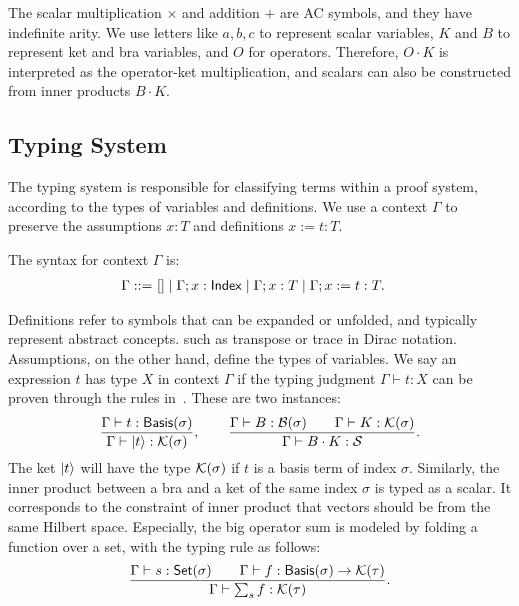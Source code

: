 The scalar multiplication $\times$ and addition $+$ are AC symbols,
and they have indefinite arity.  We use letters like $a, b, c$ to
represent scalar variables, $K$ and $B$ to represent ket and bra
variables, and $O$ for operators.  Therefore, $O \cdot K$ is
interpreted as the operator-ket multiplication, and scalars can also
be constructed from inner products $B \cdot K$.


\subsection{Typing System}
The typing system is responsible for classifying terms within a proof system, according to the types of variables and definitions. 
We use a context \( \Gamma \) to preserve the assumptions \( x : T \) and definitions \( x := t : T \).
\begin{definition}[Context]
    The syntax for context \( \Gamma \) is:
    \begin{align*}
        \Gamma ::= &\ [] \mid \Gamma; x : \mathsf{Index} \mid \Gamma; x : T \mid \Gamma; x := t : T.
    \end{align*}
\end{definition}
Definitions refer to symbols that can be expanded or unfolded, and typically represent abstract concepts. such as transpose or trace in Dirac notation. Assumptions, on the other hand, define the types of variables.
We say an expression \( t \) has type \( X \) in context \( \Gamma \) if the typing judgment \( \Gamma \vdash t : X \) can be proven through the rules in~. These are two instances:
\begin{gather*}
    \frac{\Gamma \vdash t : \mathsf{Basis}(\sigma)}{\Gamma \vdash \ket{t} : \mathcal{K}(\sigma)},
    \qquad
    \frac{\Gamma \vdash B : \mathcal{B}(\sigma) \qquad \Gamma \vdash K : \mathcal{K}(\sigma)}{\Gamma \vdash B \cdot K : \mathcal{S}}.
\end{gather*}
The ket \( \ket{t} \) will have the type \( \mathcal{K}(\sigma) \) if \( t \) is a basis term of index \( \sigma \). Similarly, the inner product between a bra and a ket of the same index \( \sigma \) is typed as a scalar. It corresponds to the constraint of inner product that vectors should be from the same Hilbert space.
Especially, the big operator sum is modeled by folding a function over a set, with the typing rule as follows:
\[
    \frac{\Gamma \vdash s : \mathsf{Set}(\sigma) \qquad \Gamma \vdash f : \mathsf{Basis}(\sigma) \to \mathcal{K}(\tau)}{\Gamma \vdash \sum_{s} f : \mathcal{K}(\tau)}.
\]


